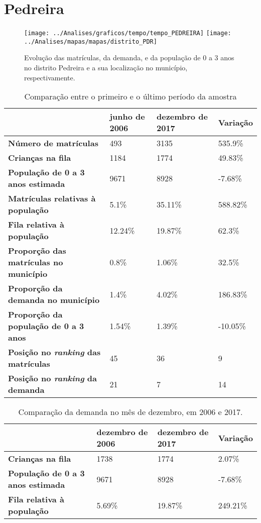 \section{Pedreira}
\begin{figure}[H]
	\centering
	\texttt{[image: ../Analises/graficos/tempo/tempo\_PEDREIRA]}
	\texttt{[image: ../Analises/mapas/mapas/distrito\_PDR]}
	\caption{Evolução das matrículas, da demanda, e da população de 0 a 3 anos no distrito Pedreira e a sua localização no município, respectivamente.}
\end{figure}
\begin{table}[H]
	\begin{tabular}{|l|l|l|l|}
		\hline
		\textbf{}                                      & \textbf{junho de 2006}       & \textbf{dezembro de 2017}    & \textbf{Variação} \\ \hline
		\textbf{Número de matrículas}                  & 493 & 3135 & 535.9\% \\ \hline
		\textbf{Crianças na fila}                      & 1184 & 1774 & 49.83\% \\ \hline
		\textbf{População de 0 a 3 anos estimada}      & 9671 & 8928 & -7.68\% \\ \hline
		\textbf{Matrículas relativas à população}      & 5.1\% & 35.11\% & 588.82\% \\ \hline
		\textbf{Fila relativa à população}             & 12.24\% & 19.87\% & 62.3\% \\ \hline
		\textbf{Proporção das matrículas no município} & 0.8\% & 1.06\% & 32.5\% \\ \hline
		\textbf{Proporção da demanda no município}     & 1.4\% & 4.02\% & 186.83\% \\ \hline
		\textbf{Proporção da população de 0 a 3 anos}  & 1.54\% & 1.39\% & -10.05\% \\ \hline
		\textbf{Posição no \textit{ranking} das matrículas}     & 45 & 36 & 9 \\ \hline
		\textbf{Posição no \textit{ranking} da demanda}         & 21 & 7 & 14 \\ \hline
	\end{tabular}
	\caption{Comparação entre o primeiro e o último período da amostra}
\end{table}
\begin{table}[H]
	\begin{tabular}{|l|l|l|l|}
		\hline
		\textbf{}                                 & \textbf{dezembro de 2006} & \textbf{dezembro de 2017} & \textbf{Variação} \\ \hline
		\textbf{Crianças na fila}                      & 1738 & 1774 & 2.07\% \\ \hline
		\textbf{População de 0 a 3 anos estimada}      & 9671 & 8928 & -7.68\% \\ \hline
		\textbf{Fila relativa à população}             & 5.69\% & 19.87\% & 249.21\% \\ \hline
	\end{tabular}
	\caption{Comparação da demanda no mês de dezembro, em 2006 e 2017.}
\end{table}
